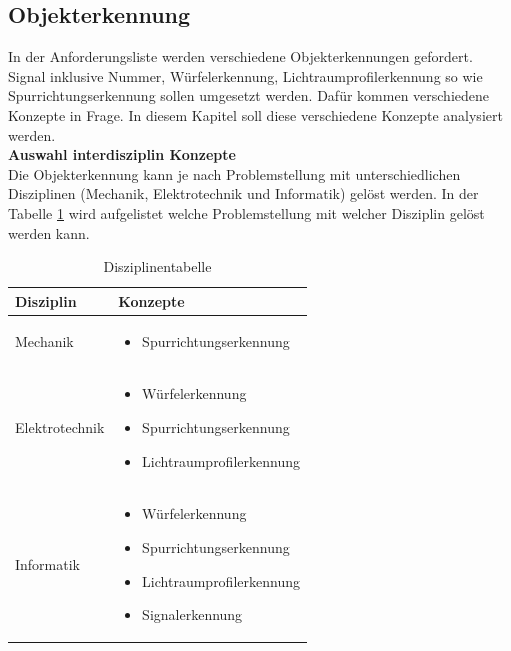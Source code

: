 \documentclass[../../main.tex]{subfiles}
\begin{document}
    \subsection{Objekterkennung}
    In der Anforderungsliste werden verschiedene Objekterkennungen gefordert. Signal inklusive Nummer,
    Würfelerkennung, Lichtraumprofilerkennung so wie Spurrichtungserkennung sollen umgesetzt werden. Dafür 
    kommen verschiedene Konzepte in Frage. In diesem Kapitel soll diese verschiedene Konzepte analysiert 
    werden.\\

    \textbf{Auswahl interdisziplin Konzepte}\\
    Die Objekterkennung kann je nach Problemstellung mit unterschiedlichen Disziplinen (Mechanik,
    Elektrotechnik und Informatik) gelöst werden. In der Tabelle \ref{tab:obj_disziplin} wird
    aufgelistet welche Problemstellung mit welcher Disziplin gelöst werden kann.
    \begin{flushleft}
        \begin{table}[h]
        \begin{tabular}{ | l | p{11cm} |}
        \hline
        \textbf{Disziplin} & \textbf{Konzepte} \\ \hline
        Mechanik & \begin{itemize}
                        \item Spurrichtungserkennung
                    \end{itemize} \\ \hline
        Elektrotechnik & \begin{itemize}
                             \item Würfelerkennung
                             \item Spurrichtungserkennung
                             \item Lichtraumprofilerkennung
                         \end{itemize} \\ \hline
        Informatik &  \begin{itemize}
                        \item Würfelerkennung
                        \item Spurrichtungserkennung
                        \item Lichtraumprofilerkennung
                        \item Signalerkennung
                      \end{itemize} \\ \hline
        \end{tabular}
        \caption{Disziplinentabelle}
        \label{tab:obj_disziplin}
    \end{table}
    \end{flushleft}
\end{document}
